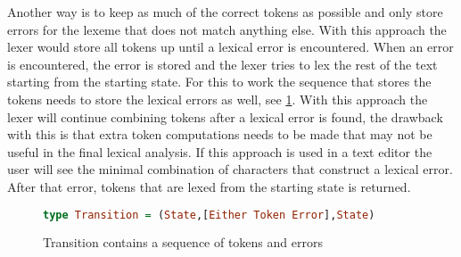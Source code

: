 Another way is to keep as much of the correct tokens as possible and only store
errors for the lexeme that does not match anything else. With this approach the
lexer would store all tokens up until a lexical error is encountered. When an
error is encountered, the error is stored and the lexer tries to lex the rest of
the text starting from the starting state. For this to work the sequence that
stores the tokens needs to store the lexical errors as well, see
\cref{fig:error2}. With this approach the lexer will continue combining tokens
after a lexical error is found, the drawback with this is that extra
token computations needs to be made that may not be useful in the final lexical
analysis. If this approach is used in a text editor the user will see the minimal
combination of characters that construct a lexical error. After that error,
tokens that are lexed from the starting state is returned.

\begin{figure}[!ht]
  \begin{lstlisting}[language=Haskell]
    type Transition = (State,[Either Token Error],State)
  \end{lstlisting}
  \caption{Transition contains a sequence of tokens and errors\label{fig:error2}}
\end{figure}

